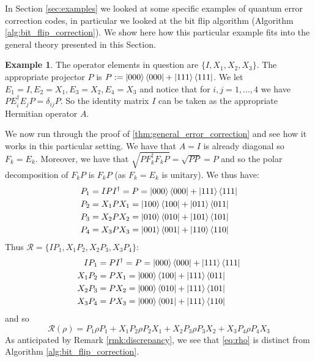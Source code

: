 \documentclass[12pt]{article}
\theoremstyle{plain}
\theoremstyle{definition}
\newtheorem{example}[thm]{Example}
\newcommand{\call}[1]{\mathcal{#1}}
\begin{document}
In Section \ref{sec:examples} we looked at some specific examples of quantum error correction codes, in particular we looked at the bit flip algorithm (Algorithm \ref{alg:bit_flip_correction}). We show here how this particular example fits into the general theory presented in this Section.

\begin{example}
	The operator elements in question are $\lbrace I, X_1, X_2, X_3\rbrace$. The appropriate projector $P$ is $P := \ket{000}\bra{000} + \ket{111}\bra{111}$. We let $E_1 = I, E_2 = X_1, E_3 = X_2, E_4 = X_3$ and notice that for $i,j = 1,...,4$ we have $PE_i^\dagger E_j P = \delta_{ij}P$. So the identity matrix $I$ can be taken as the appropriate Hermitian operator $A$.
	
	We now run through the proof of \ref{thm:general_error_correction} and see how it works in this particular setting. We have that $A = I$ is already diagonal so $F_k = E_k$. Moreover, we have that $\sqrt{PF_k^\dagger F_k P} = \sqrt{PP} = P$ and so the polar decomposition of $F_k P$ is $F_kP$ (as $F_k = E_k$ is unitary). We thus have:
	\begin{align*}
		P_1 &= IPI^\dagger = P = \ket{000}\bra{000} + \ket{111}\bra{111}\\
		P_2 &= X_1 P X_1 = \ket{100}\bra{100} + \ket{011}\bra{011}\\
		P_3 &= X_2 P X_2 = \ket{010}\bra{010} + \ket{101}\bra{101}\\
		P_4 &= X_3 P X_3 = \ket{001}\bra{001} + \ket{110}\bra{110}\\
	\end{align*}
Thus $\call{R} = \{ I P_1, X_1 P_2, X_2 P_3, X_3 P_4  \}$:
\begin{align*}
	IP_1 &= PI^\dagger = P = \ket{000}\bra{000} + \ket{111}\bra{111}\\
	X_1P_2 &= P X_1 = \ket{000}\bra{100} + \ket{111}\bra{011}\\
	X_2P_3 &= P X_2 = \ket{000}\bra{010} + \ket{111}\bra{101}\\
	X_3P_4 &= P X_3 = \ket{000}\bra{001} + \ket{111}\bra{110}\\
	\end{align*}and so
\begin{equation}\label{eq:rho}
	\call{R}(\rho) = P_1 \rho P_1 + X_1 P_2 \rho P_2 X_1 + X_2 P_3 \rho P_3 X_2 + X_3 P_4 \rho P_4 X_3
	\end{equation}
As anticipated by Remark \ref{rmk:discrepancy}, we see that \eqref{eq:rho} is distinct from Algorithm \ref{alg:bit_flip_correction}.
\end{example}
\end{document}
